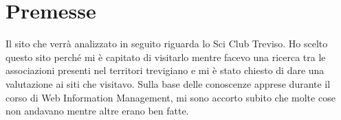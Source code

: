 
\chapter{Premesse}
\label{cap:premesse}

Il sito che verrà analizzato in seguito riguarda lo Sci Club Treviso. Ho scelto questo sito perché mi è capitato di visitarlo mentre facevo una ricerca tra le associazioni presenti nel territori trevigiano e mi è stato chiesto di dare una valutazione ai siti che visitavo. Sulla base delle conoscenze apprese durante il corso di Web Information Management, mi sono accorto subito che molte cose non andavano mentre altre erano ben fatte.
